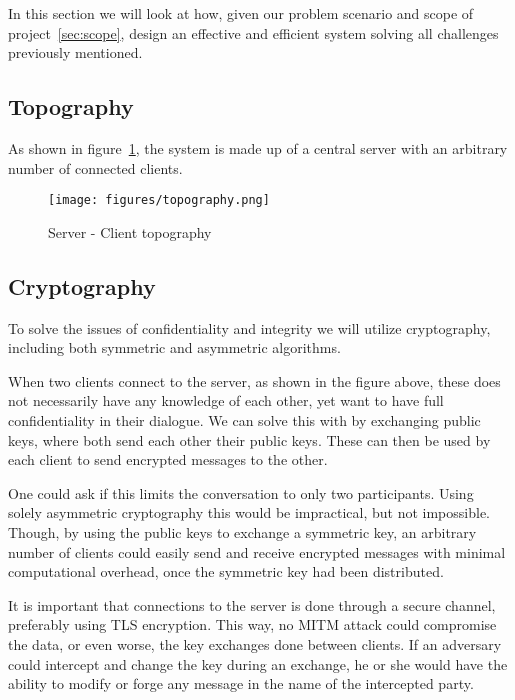 
In this section we will look at how, given our problem
scenario and scope of project~\ref{sec:scope},
design an effective and efficient system solving all
challenges previously mentioned.


\subsection{Topography}

As shown in figure~\ref{fig:topo}, the system is made up of
a central server with an arbitrary number of connected clients.

\begin{figure}[ht]
  \centering
  \texttt{[image: figures/topography.png]}
  \caption{\label{fig:topo} Server - Client topography}
\end{figure}


\subsection{Cryptography}

To solve the issues of confidentiality and integrity we will utilize
cryptography, including both symmetric and asymmetric algorithms.

When two clients connect to the server, as shown in the figure above,
these does not necessarily have any knowledge of each other, yet want
to have full confidentiality in their dialogue. We can solve this with
by exchanging public keys, where both send each other their public
keys. These can then be used by each client to send encrypted messages
to the other.

One could ask if this limits the conversation to only two
participants. Using solely asymmetric cryptography this would be
impractical, but not impossible. Though, by using the public keys to
exchange a symmetric key, an arbitrary number of clients could easily
send and receive encrypted messages with minimal computational
overhead, once the symmetric key had been distributed.

It is important that connections to the server is done through a
secure channel, preferably using TLS encryption. This way, no MITM
attack could compromise the data, or even worse, the key exchanges
done between clients. If an adversary could intercept and change the
key during an exchange, he or she would have the ability to modify or
forge any message in the name of the intercepted party.

